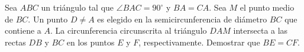 Sea $ABC$ un triángulo tal que $\angle BAC = 90^{\circ}$ y $BA = CA$. Sea $M$ el punto medio de $BC$. Un punto $D \neq A$ es elegido en la semicircunferencia de diámetro $BC$ que contiene a $A$. La circunferencia circunscrita al triángulo $DAM$ intersecta a las rectas $DB$ y $BC$ en los puntos $E$ y $F$, respectivamente. Demostrar que $BE = CF$.
